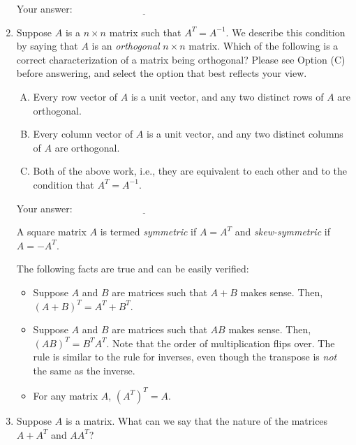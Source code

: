 \documentclass[10pt]{amsart}
\begin{document}
\begin{enumerate}
  \vspace{0.1in}
  Your answer: $\underline{\qquad\qquad\qquad\qquad\qquad\qquad\qquad}$
  \vspace{0.1in}

\item Suppose $A$ is a $n \times n$ matrix such that $A^T =
  A^{-1}$. We describe this condition by saying that $A$ is an {\em
    orthogonal} $n \times n$ matrix. Which of the following is a
  correct characterization of a matrix being orthogonal? Please see
  Option (C) before answering, and select the option that best
  reflects your view.

  \begin{enumerate}[(A)]
  \item Every row vector of $A$ is a unit vector, and any two distinct
    rows of $A$ are orthogonal.
  \item Every column vector of $A$ is a unit vector, and any two
    distinct columns of $A$ are orthogonal.
  \item Both of the above work, i.e., they are equivalent to each
    other and to the condition that $A^T = A^{-1}$.
  \end{enumerate}

  \vspace{0.1in}
  Your answer: $\underline{\qquad\qquad\qquad\qquad\qquad\qquad\qquad}$
  \vspace{0.1in}

  A square matrix $A$ is termed {\em symmetric} if $A = A^T$ and {\em
    skew-symmetric} if $A = -A^T$. 

  The following facts are true and can be easily verified:

  \begin{itemize}
  \item Suppose $A$ and $B$ are matrices such that $A + B$ makes
    sense. Then, $(A + B)^T = A^T + B^T$.
  \item Suppose $A$ and $B$ are matrices such that $AB$ makes
    sense. Then, $(AB)^T = B^TA^T$. Note that the order of
    multiplication flips over. The rule is similar to the rule for
    inverses, even though the transpose is {\em not} the same as the
    inverse.
  \item For any matrix $A$, $(A^T)^T = A$.
  \end{itemize}

\item Suppose $A$ is a matrix. What can we say that the nature of the
  matrices $A + A^T$ and $AA^T$?


\end{enumerate}
\end{document}
